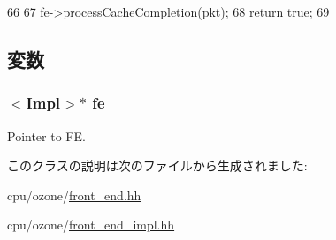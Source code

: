 \begin{DoxyCode}
66 {
67     fe->processCacheCompletion(pkt);
68     return true;
69 }
\end{DoxyCode}


\subsection{変数}
\hypertarget{classFrontEnd_1_1IcachePort_a639e39cd16b0e1d657b223db6f848764}{
\subsubsection[{fe}]{$<$Impl$>$$\ast$ {\bf fe}}}
\label{classFrontEnd_1_1IcachePort_a639e39cd16b0e1d657b223db6f848764}
Pointer to FE. 

このクラスの説明は次のファイルから生成されました:\begin{DoxyCompactItemize}
\item 
cpu/ozone/\hyperlink{front__end_8hh}{front\_\-end.hh}\item 
cpu/ozone/\hyperlink{front__end__impl_8hh}{front\_\-end\_\-impl.hh}\end{DoxyCompactItemize}

